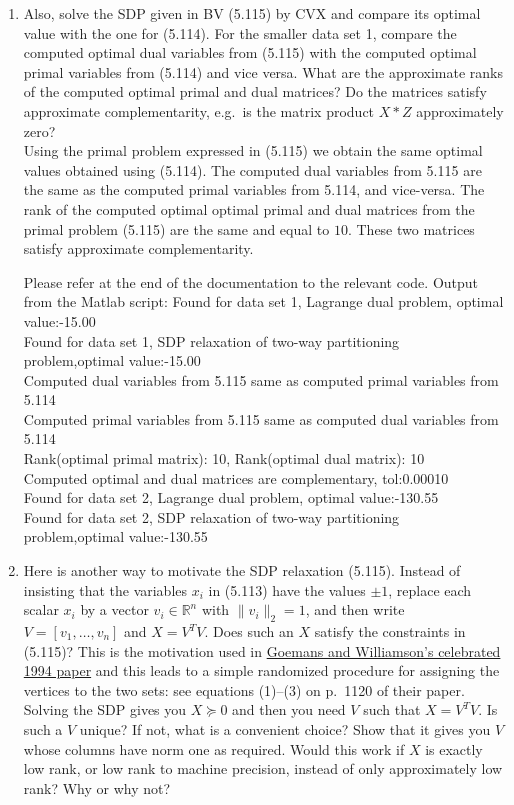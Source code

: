 \documentclass[11pt]{article}
\newcommand{\R}{\mathbb R}
\begin{document}
\begin{enumerate}
\begin{enumerate}
 \item Also, solve the SDP given in BV (5.115) by CVX and compare its optimal value with the one for (5.114). 
 For the smaller data set 1, compare the computed optimal dual variables
 from (5.115) with the computed optimal primal variables from (5.114) and vice versa.
 What are the approximate ranks of the computed optimal primal and dual matrices? Do the matrices satisfy
 approximate complementarity, e.g.\ is the matrix product $X*Z$ approximately zero?\\
 
 \medskip
Using the primal problem expressed in (5.115) we obtain the same optimal values obtained using (5.114).
The computed dual variables from 5.115 are the same as the computed primal variables from 5.114, and vice-versa.
The rank of the computed optimal optimal primal  and dual matrices from the primal problem (5.115) are the same and equal to $10$.
These two matrices satisfy approximate complementarity.
 \medskip

Please refer at the end of the documentation to the relevant code.
Output from the Matlab script:
Found for data set 1, Lagrange dual problem, optimal value:-15.00\\
Found for data set 1, SDP relaxation of two-way partitioning problem,optimal value:-15.00\\
Computed dual variables from 5.115 same as computed primal variables from 5.114\\
Computed primal variables from 5.115 same as computed dual variables from 5.114\\
Rank(optimal primal matrix): 10, Rank(optimal dual matrix): 10\\
Computed optimal and dual matrices are complementary, tol:0.00010\\
Found for data set 2, Lagrange dual problem, optimal value:-130.55\\
Found for data set 2, SDP relaxation of two-way partitioning problem,optimal value:-130.55\\

  
 \item Here is another way to motivate the SDP relaxation (5.115). Instead of insisting that the variables $x_i$ in (5.113) have the
 values $\pm 1$, replace
 each scalar $x_i$ by a vector $v_i\in\R^n$ with $\|v_i\|_2=1$, and then write $V=[v_1,\ldots,v_n]$ and $X=V^TV$. 
 Does such an $X$ satisfy the constraints in (5.115)? This is the motivation used
 in \href{http://www-math.mit.edu/~goemans/PAPERS/maxcut-jacm.pdf}{Goemans and Williamson's celebrated 1994 paper} 
 and this leads to a simple randomized procedure for assigning the vertices to the two sets: see equations (1)--(3) on p.~1120 of
 their paper. Solving the SDP gives you $X\succeq 0$ and then you need $V$ such that $X=V^TV$. Is such a $V$ unique? If not, what
 is a convenient choice? Show that it gives you $V$ whose columns have norm one as required. Would this work if $X$ is exactly low rank,
 or low rank to machine precision, instead of only approximately low rank? Why or why not?
 

\end{enumerate}
\end{enumerate}
\end{document}
